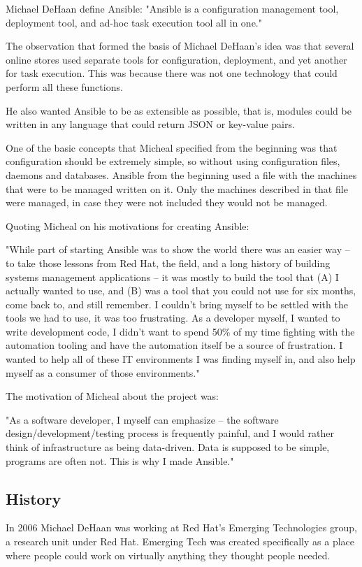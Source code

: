 \documentclass[12pt,a4paper,openright,twoside]{book}
\begin{document}
Michael DeHaan define Ansible:
"Ansible is a configuration management tool, deployment tool, and ad-hoc task execution tool all in one."


The observation that formed the basis of Michael DeHaan's idea was that several online stores used separate tools for configuration, deployment, and yet another for task execution. This was because there was not one technology that could perform all these functions.


He also wanted Ansible to be as extensible as possible, that is, modules could be written in any language that could return JSON or key-value pairs.

One of the basic concepts that Micheal specified from the beginning was that configuration should be extremely simple, so without using configuration files, daemons and databases. Ansible from the beginning used a file with the machines that were to be managed written on it. Only the machines described in that file were managed, in case they were not included they would not be managed.

Quoting Micheal on his motivations for creating Ansible:


"While part of starting Ansible was to show the world there was an easier way -- to take those lessons from Red Hat, the field, and a long history of building systems management applications -- it was mostly to build the tool that (A) I actually wanted to use, and (B) was a tool that you could not use for six months, come back to, and still remember. I couldn't bring myself to be settled with the tools we had to use, it was too frustrating. As a developer myself, I wanted to write development code, I didn't want to spend 50\% of my time fighting with the automation tooling and have the automation itself be a source of frustration. I wanted to help all of these IT environments I was finding myself in, and also help myself as a consumer of those environments."

The motivation of Micheal about the project was:


"As a software developer, I myself can emphasize -- the software design/development/testing process is frequently painful, and I would rather think of infrastructure as being data-driven. Data is supposed to be simple, programs are often not. This is why I made Ansible."

\subsection{History}
In 2006 Michael DeHaan was working at Red Hat's Emerging Technologies group, a research unit under Red Hat. Emerging Tech was created specifically as a place where people could work on virtually anything they thought people needed.
\end{document}
